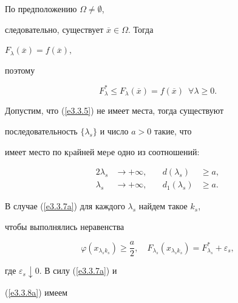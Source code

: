 \begin{pf}


По предположению $\Omega\neq \emptyset$,


следовательно, существует $\overline{x}\in\Omega$. Тогда


$F_{\lambda}(\overline{x}) = f(\overline{x}),$ \


поэтому


\begin{equation}\label{e3.3.6}


F^{*}_{\lambda}\leq F_{\lambda}(\overline{x}) = f(\overline{x})


\ \; \forall \lambda\geq 0.




\end{equation}


Допустим, что (\ref{e3.3.5}) не имеет места, тогда существуют


последовательность $\{\lambda_s\}$ и число $a > 0$ такие, что


имеет место по кpайней меpе одно из соотношений:


\begin{alignat}{2}


\label{e3.3.7a}


\lambda_s&\rightarrow +\infty,&\quad d(\lambda_s)&\geq a, \\


%


\label{e3.3.7b}


\lambda_s&\rightarrow +\infty,&\quad d_1(\lambda_s)&\geq a.


\end{alignat}


В случае (\ref{e3.3.7a}) для каждого $\lambda_s$ найдем такое $k_s$,


чтобы выполнялись неравенства


\begin{equation}\label{e3.3.8a}


\varphi(x_{\lambda_sk_s})\geq\frac{a}{2},\quad F_{\lambda_


s}(x_{\lambda_sk_s}) = F^{*}_{\lambda_s} + \varepsilon_s,




\end{equation}


где $\varepsilon_s\downarrow 0$. В силу (\ref{e3.3.7a}) и


(\ref{e3.3.8a}) имеем


\begin{equation}\label{e3.3.9a}



\end{equation}
\end{pf}
